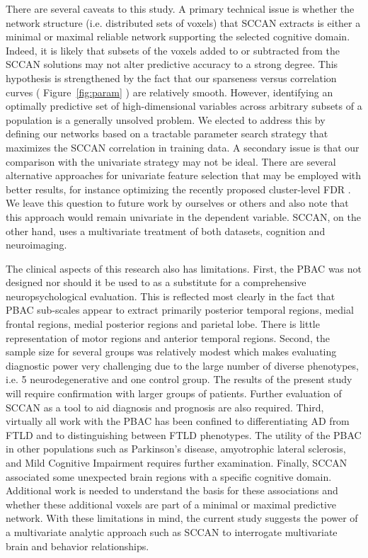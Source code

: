 \documentclass[preprint,authoryear,12pt]{elsarticle}
\begin{document}
There are several caveats to this study.  A primary technical issue is whether the network structure (i.e. distributed sets of voxels) that SCCAN extracts is either a minimal or maximal reliable network supporting the selected cognitive domain.  Indeed, it is likely that subsets of the voxels added to or subtracted from the SCCAN solutions may not alter predictive accuracy to a strong degree.  This hypothesis is strengthened by the fact that our sparseness versus correlation curves ( Figure~\ref{fig:param} ) are relatively smooth. However, identifying an optimally predictive set of high-dimensional variables across arbitrary subsets of a population is a generally unsolved problem.  We elected to address this by defining our networks based on a tractable parameter search strategy that maximizes the SCCAN correlation in training data.  A secondary issue is that our comparison with the univariate strategy may not be ideal.  There are several alternative approaches for univariate feature selection that may be employed with better results, for instance optimizing the recently proposed cluster-level FDR \citet{Chumbley2009}.  We leave this question to future work by ourselves or others and also note that this approach would remain univariate in the dependent variable.  SCCAN, on the other hand, uses a multivariate treatment of both datasets, cognition and neuroimaging.

The clinical aspects of this research also has limitations.  First, the PBAC was not designed nor should it be used to as a substitute for a comprehensive neuropsychological evaluation. This is reflected most clearly in the fact that PBAC sub-scales appear to extract primarily posterior temporal regions, medial frontal regions, medial posterior regions and parietal lobe.  There is little representation of motor regions and anterior temporal regions.  Second, the sample size for several groups was relatively modest which makes evaluating diagnostic power very challenging due to the large number of diverse phenotypes, i.e. 5 neurodegenerative and one control group.  The results of the present study will require confirmation with larger groups of patients.  Further evaluation of SCCAN as a tool to aid diagnosis and prognosis are also required.  Third, virtually all work with the PBAC has been confined to differentiating AD from FTLD and to distinguishing between FTLD phenotypes.  The utility of the PBAC in other populations such as Parkinson's disease, amyotrophic lateral sclerosis, and Mild Cognitive Impairment requires further examination.  Finally, SCCAN associated some unexpected brain regions with a specific cognitive domain.  Additional work is needed to understand the basis for these associations and whether these additional voxels are part of a minimal or maximal predictive network.  With these limitations in mind, the current study suggests the power of a multivariate analytic approach such as SCCAN to interrogate multivariate brain and behavior relationships.  
\end{document}
